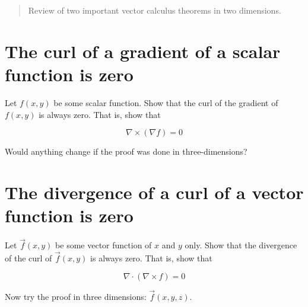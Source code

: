 \documentclass[10pt]{article}
\begin{document}
\maketitle

\begin{abstract}
Review of two important vector calculus theorems in two dimensions.
\end{abstract}
\noindent

\section{The curl of a gradient of a scalar function is zero}

Let $f(x,y)$ be some scalar function. Show that the curl of the gradient of $f(x,y)$ is always zero.  That is, show that

\begin{equation}
\nabla \times (\nabla f) = 0
\end{equation}

\vspace{3cm}

Would anything change if the proof was done in three-dimensions?

\section{The divergence of a curl of a vector function is zero}

Let $\vec{f}(x,y)$ be some vector function of $x$ and $y$ only.  Show that the divergence of the curl of $\vec{f}(x,y)$ is always zero.  That is, show that

\begin{equation}
\nabla \cdot (\nabla \times f) = 0
\end{equation}

Now try the proof in three dimensions: $\vec{f}(x,y,z)$.
\end{document}
